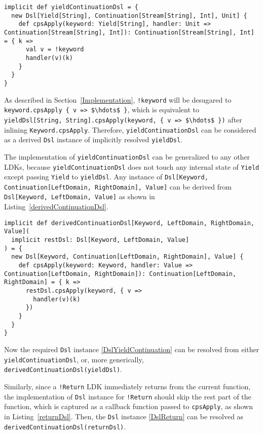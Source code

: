 \begin{lstlisting}[caption={The derived \lstinline{Dsl} instance for \lstinline{Yield} LDK, which can be used in a \lstinline{Continuation}},label={yieldContinuationDsl}]
implicit def yieldContinuationDsl = {
  new Dsl[Yield[String], Continuation[Stream[String], Int], Unit] {
    def cpsApply(keyword: Yield[String], handler: Unit => Continuation[Stream[String], Int]): Continuation[Stream[String], Int] = { k =>
      val v = !keyword
      handler(v)(k)
    }
  }
}
\end{lstlisting}

As described in Section~\ref{Implementation}, \lstinline{!keyword} will be desugared to \lstinline[mathescape=true]|keyword.cpsApply { v => $\hdots$ }|, which is equivalent to \lstinline[mathescape=true]|yieldDsl[String, String].cpsApply(keyword, { v => $\hdots$ })| after inlining \lstinline{Keyword.cpsApply}. Therefore, \lstinline{yieldContinuationDsl} can be considered as a derived \lstinline{Dsl} instance of implicitly resolved \lstinline{yieldDsl}.

The implementation of \lstinline{yieldContinuationDsl} can be generalized to any other LDKs, because \lstinline{yieldContinuationDsl} does not touch any internal state of \lstinline{Yield} except passing \lstinline{Yield} to \lstinline{yieldDsl}. Any instance of \lstinline{Dsl[Keyword, Continuation[LeftDomain, RightDomain], Value]} can be derived from \lstinline{Dsl[Keyword, LeftDomain, Value]} as shown in Listing~\ref{derivedContinuationDsl}.

\begin{lstlisting}[caption={The generic derived \lstinline{Dsl} instance for any LDK, which can be used in a \lstinline{Continuation}},label={derivedContinuationDsl}]
implicit def derivedContinuationDsl[Keyword, LeftDomain, RightDomain, Value](
  implicit restDsl: Dsl[Keyword, LeftDomain, Value]
) = {
  new Dsl[Keyword, Continuation[LeftDomain, RightDomain], Value] {
    def cpsApply(keyword: Keyword, handler: Value => Continuation[LeftDomain, RightDomain]): Continuation[LeftDomain, RightDomain] = { k =>
      restDsl.cpsApply(keyword, { v =>
        handler(v)(k)
      })
    }
  }
}
\end{lstlisting}

Now the required \lstinline{Dsl} instance \ref{DslYieldContinuation} can be resolved from either \lstinline{yieldContinuationDsl}, or, more generically, \lstinline{derivedContinuationDsl(yieldDsl)}.


Similarly, since a \lstinline{!Return} LDK immediately returns from the current function, the implementation of \lstinline{Dsl} instance for \lstinline{!Return} should skip the rest part of the function, which is captured as a callback function passed to \lstinline{cpsApply}, as shown in Listing~\ref{returnDsl}. Then, the \lstinline{Dsl} instance \ref{DslReturn} can be resolved as \lstinline{derivedContinuationDsl(returnDsl)}.

